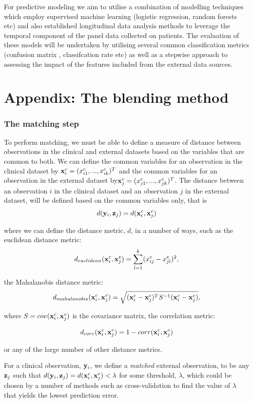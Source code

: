\documentclass{article}
\begin{document}
For predictive modeling we aim to utilise a combination of modelling techniques
which employ supervised machine learning (logistic regression, random forests etc) 
and also established longitudinal data analysis methods to leverage the temporal 
component of the panel data collected on patients. The evaluation of these 
models will be undertaken by utilising several common classification metrics (confusion matrix
, classifcation rate etc) as well as a stepwise approach to assessing the 
impact of the features included from the external data sources.

\section*{Appendix: The blending method}


\subsubsection*{The matching step}

To perform matching, we must be able to define a measure of distance between observations in the clinical and external datasets based on the variables that are common to both. We can define the common variables for an observation in the clinical dataset by ${\bf x}_i^c = (x_{i1}^c, ..., x_{ik}^c)^T$ and the common variables for an observation in the external dataset by${\bf x}_j^e = (x_{j1}^e, ..., x_{jk}^e)^T$. The distance between an observation $i$ in the clinical dataset and an observation $j$ in the external dataset, will be defined based on the common variables only, that is
$$d({\bf y}_i, {\bf z}_j) = d({\bf x}_i^c, {\bf x}_j^e)$$

where we can define the distance metric, $d$, in a number of ways, such as the euclidean distance metric:
$$d_{euclidean}({\bf x}_i^c, {\bf x}_j^e) = \sum_{l=1}^k(x_{ij}^c - x_{jl}^e)^2,$$

the Mahalanobis distance metric:
$$d_{mahalanobis}({\bf x}_i^c, {\bf x}_j^e) = \sqrt{({\bf x}_i^c - {\bf x}_j^e)^T S^{-1}({\bf x}_i^c - {\bf x}_j^e)},$$

where $S = cov({\bf x}_i^c, {\bf x}_j^e)$ is the covariance matrix, the correlation metric:

$$d_{corr}({\bf x}_i^c, {\bf x}_j^e) = 1 - corr({\bf x}_i^c, {\bf x}_j^e)$$

or any of the large number of other distance metrics.


For a clinical observation, ${\bf y}_i$, we define a \emph{matched} external observation, to be any ${\bf z}_j$ such that $d({\bf y}_i, {\bf z}_j) = d({\bf x}^c_i, {\bf x}^e_j) < \lambda$ for some threshold, $\lambda$, which could be chosen by a number of methods such as cross-validation to find the value of $\lambda$ that yields the lowest prediction error. 
\end{document}
